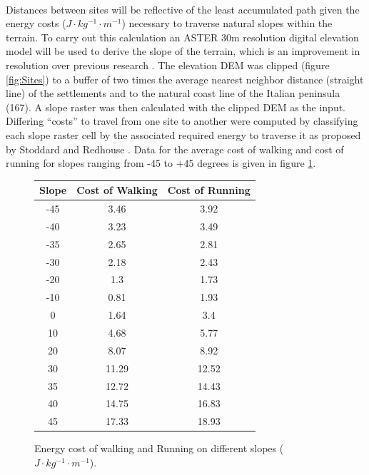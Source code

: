 \documentclass[12pt,a4paper]{thesis}
\begin{document}
\paragraph{}	
Distances between sites will be reflective of the least accumulated path given the energy costs ($J\cdot kg^{-1}\cdot m^{-1}$) necessary to traverse natural slopes within the terrain. To carry out this calculation an ASTER 30m resolution digital elevation model will be used to derive the slope of the terrain, which is an improvement in resolution over previous research \citep[165]{StoRed11}. The elevation DEM was clipped (figure \ref{fig:Sites}) to a buffer of two times the average nearest neighbor distance (straight line) of the settlements and to the natural coast line of the Italian peninsula (167). A slope raster was then calculated with the clipped DEM as the input. Differing ``costs'' to travel from one site to another were computed by classifying each slope raster cell by the associated required energy to traverse it as proposed by Stoddard and Redhouse \citeyearpar{StoRed11}. Data for the average cost of walking and cost of running for slopes ranging from -45 to +45 degrees \citep{Min02} is given in figure \ref{fig:CostData}.   

\begin{figure}
\centering
\begin{tabular}{|c|c|c|}
\hline Slope & Cost of Walking & Cost of Running \\ 
\hline -45 & 3.46 & 3.92 \\ 
\hline -40 & 3.23 & 3.49 \\ 
\hline -35 & 2.65 & 2.81 \\ 
\hline -30 & 2.18 & 2.43 \\ 
\hline -20 & 1.3 & 1.73 \\ 
\hline -10 & 0.81 & 1.93 \\ 
\hline 0 & 1.64 & 3.4 \\ 
\hline 10 & 4.68 & 5.77 \\ 
\hline 20 & 8.07 & 8.92 \\ 
\hline 30 & 11.29 & 12.52 \\ 
\hline 35 & 12.72 & 14.43 \\ 
\hline 40 & 14.75 & 16.83 \\ 
\hline 45 & 17.33 & 18.93 \\ 
\hline 
\end{tabular} 
\caption{Energy cost of walking and Running on different slopes ($J\cdot kg^{-1}\cdot m^{-1}$).}
\label{fig:CostData}
\end{figure}
\end{document}
